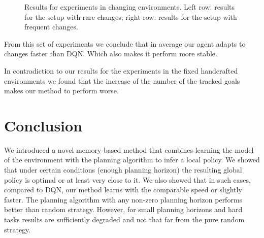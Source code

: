 \documentclass[runningheads]{llncs}
\begin{document}
\begin{figure}
  \centering
  \begin{minipage}{.49\linewidth}
    
    
    
    
  \end{minipage}
  \begin{minipage}{.49\linewidth}
    
    
    
    
  \end{minipage}

  \caption{Results for experiments in changing environments. Left row: results for the setup with rare changes; right row: results for the setup with frequent changes.}
\end{figure}

From this set of experiments we conclude that in average our agent adapts to changes faster than DQN. Which also makes it perform more stable.

In contradiction to our results for the experiments in the fixed handcrafted environments we found that the increase of the number of the tracked goals makes our method to perform worse.

\section{Conclusion}

We introduced a novel memory-based method that combines learning the model of the environment with the planning algorithm to infer a local policy. We showed that under certain conditions (enough planning horizon) the resulting global policy is optimal or at least very close to it. We also showed that in such cases, compared to DQN, our method learns with the comparable speed or slightly faster. The planning algorithm with any non-zero planning horizon performs better than random strategy. However, for small planning horizons and hard tasks results are sufficiently degraded and not that far from the pure random strategy.
\end{document}
